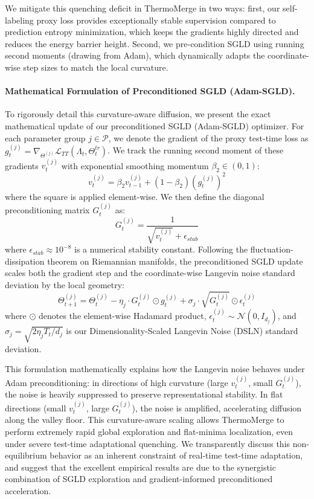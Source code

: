 We mitigate this quenching deficit in ThermoMerge in two ways: first, our self-labeling proxy loss provides exceptionally stable supervision compared to prediction entropy minimization, which keeps the gradients highly directed and reduces the energy barrier height.
Second, we pre-condition SGLD using running second moments (drawing from Adam), which dynamically adapts the coordinate-wise step sizes to match the local curvature.

\paragraph{Mathematical Formulation of Preconditioned SGLD (Adam-SGLD).} To rigorously detail this curvature-aware diffusion, we present the exact mathematical update of our preconditioned SGLD (Adam-SGLD) optimizer.
For each parameter group $j \in \mathcal{P}$, we denote the gradient of the proxy test-time loss as $g_t^{(j)} = \nabla_{\Theta^{(j)}} \mathcal{L}_{TT}(\Lambda_t, \Theta_t^{tr})$.
We track the running second moment of these gradients $v_t^{(j)}$ with exponential smoothing momentum $\beta_2 \in (0, 1)$:
\begin{equation}
    v_t^{(j)} = \beta_2 v_{t-1}^{(j)} + (1 - \beta_2) \left(g_t^{(j)}\right)^2
\end{equation}
where the square is applied element-wise. We then define the diagonal preconditioning matrix $G_t^{(j)}$ as:
\begin{equation}
    G_t^{(j)} = \frac{1}{\sqrt{v_t^{(j)}} + \epsilon_{stab}}
\end{equation}
where $\epsilon_{stab} \approx 10^{-8}$ is a numerical stability constant.
Following the fluctuation-dissipation theorem on Riemannian manifolds, the preconditioned SGLD update scales both the gradient step and the coordinate-wise Langevin noise standard deviation by the local geometry:
\begin{equation}
    \Theta_{t+1}^{(j)} = \Theta_t^{(j)} - \eta_j \cdot G_t^{(j)} \odot g_t^{(j)} + \sigma_j \cdot \sqrt{G_t^{(j)}} \odot \epsilon_t^{(j)}
\end{equation}
where $\odot$ denotes the element-wise Hadamard product, $\epsilon_t^{(j)} \sim \mathcal{N}(0, I_{d_j})$, and $\sigma_j = \sqrt{2 \eta_j T_t / d_j}$ is our Dimensionality-Scaled Langevin Noise (DSLN) standard deviation.

This formulation mathematically explains how the Langevin noise behaves under Adam preconditioning: in directions of high curvature (large $v_t^{(j)}$, small $G_t^{(j)}$), the noise is heavily suppressed to preserve representational stability.
In flat directions (small $v_t^{(j)}$, large $G_t^{(j)}$), the noise is amplified, accelerating diffusion along the valley floor.
This curvature-aware scaling allows ThermoMerge to perform extremely rapid global exploration and flat-minima localization, even under severe test-time adaptational quenching.
We transparently discuss this non-equilibrium behavior as an inherent constraint of real-time test-time adaptation, and suggest that the excellent empirical results are due to the synergistic combination of SGLD exploration and gradient-informed preconditioned acceleration.

